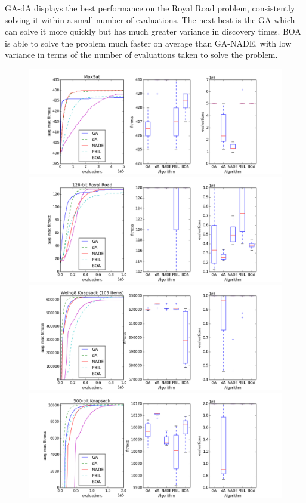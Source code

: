 \documentclass[twoside]{article}
\begin{document}
GA-dA displays the best performance on the Royal Road problem, consistently solving it within a small number of evaluations. The next best is the GA which can solve it more quickly but has much greater variance in discovery times. BOA is able to solve the problem much faster on average than GA-NADE, with low variance in terms of the number of evaluations taken to solve the problem. 
\begin{figure}[t!]
\centering
    \includegraphics[scale=0.38]{results/maxsat.png}
    \includegraphics[scale=0.38]{results/royal_road.png}
    \includegraphics[scale=0.38]{results/knapsack_105.png}
    \includegraphics[scale=0.38]{results/knapsack_500.png}
  \caption{}
  \label{figure:results_plots1}
\end{figure}
\end{document}

